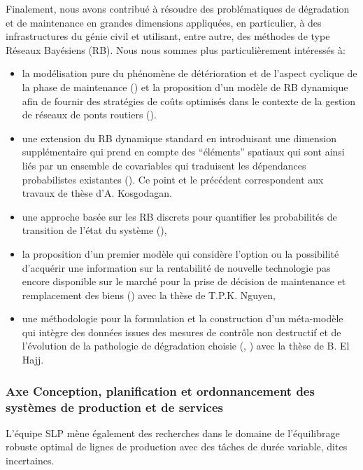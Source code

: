 Finalement, nous avons contribué à résoudre des problématiques de
dégradation et de maintenance en grandes dimensions appliquées, en
particulier, à des infrastructures du génie civil et utilisant, entre
autre, des méthodes de type Réseaux Bayésiens (RB). Nous nous sommes
plus particulièrement intéressés à:
\begin{itemize}
\item la modélisation pure du phénomène de détérioration et de
  l'aspect cyclique de la phase de maintenance
  (\cite{kosgodagan:hal-01517154}) et la proposition d'un modèle de RB
  dynamique afin de fournir des stratégies de coûts optimisés dans le
  contexte de la gestion de réseaux de ponts routiers
  (\cite{kosgodagandallatorre:hal-01517168}).
\item une extension du RB dynamique standard en introduisant une
  dimension supplémentaire qui prend en compte des ``éléments''
  spatiaux qui sont ainsi liés par un ensemble de covariables qui
  traduisent les dépendances probabilistes existantes
  (\cite{kosgodagan:hal-01517174}). Ce point et le précédent
  correspondent aux travaux de thèse d'A. Kosgodagan.
\item une approche basée sur les RB discrets pour quantifier les
  probabilités de transition de l'état du système
  (\cite{acharige:hal-01152564}),
\item la proposition d'un premier modèle qui considère l'option ou la
  possibilité d'acquérir une information sur la rentabilité de
  nouvelle technologie pas encore disponible sur le marché pour la
  prise de décision de maintenance et remplacement des biens
  (\cite{nguyen:hal-01520843}) avec la thèse de T.P.K. Nguyen,
\item une méthodologie pour la formulation et la construction d'un
  méta-modèle qui intègre des données issues des mesures de contrôle
  non destructif et de l'évolution de la pathologie de dégradation
  choisie (\cite{elhajj:hal-01520822}, \cite{elhajj:hal-01316236})
  avec la thèse de B. El Hajj.
\end{itemize}

  \subsubsection{Axe Conception, planification et ordonnancement des systèmes de production et de services}
  
L’équipe SLP mène également des recherches dans le domaine de l’équilibrage robuste optimal de lignes de production avec des tâches de durée variable, dites incertaines. 

